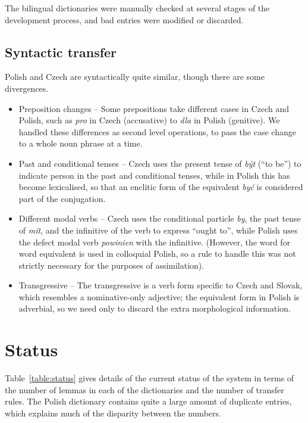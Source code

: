\documentclass[11pt]{article}
\begin{document}
The bilingual dictionaries were manually checked at several stages of the development 
process, and bad entries were modified or discarded. 

\subsection{Syntactic transfer}

Polish and Czech are syntactically quite similar, though there are some divergences.

\begin{itemize}
\item Preposition changes -- Some prepositions take different cases in Czech and Polish,
such as \emph{pro} in Czech (accusative) to \emph{dla} in Polish (genitive). We handled
these differences as second level operations, to pass the case change to a whole noun
phrase at a time.
\item Past and conditional tenses -- Czech uses the present tense of \emph{být} (``to be'') to 
indicate person in the past and conditional tenses, while in Polish this has become
lexicalised, so that an enclitic form of the equivalent \emph{być} is considered part
of the conjugation.
\item Different modal verbs -- Czech uses the conditional particle \emph{by}, the past tense
of \emph{mít}, and the infinitive of the verb to express ``ought to'', while Polish uses
the defect modal verb \emph{powinien} with the infinitive. (However, the word for word
equivalent is used in colloquial Polish, so a rule to handle this was not strictly 
necessary for the purposes of assimilation).
\item Transgressive -- The transgressive is a verb form specific to Czech and
Slovak, which resembles a nominative-only adjective; the equivalent form in Polish is
adverbial, so we need only to discard the extra morphological information.
\end{itemize}

\section{Status}

Table~\ref{table:status} gives details of the current status of the system
in terms of the number of lemmas in each of the dictionaries and the number 
of transfer rules. The Polish dictionary contains quite a large amount of
duplicate entries, which explains much of the disparity between the numbers.
\end{document}
